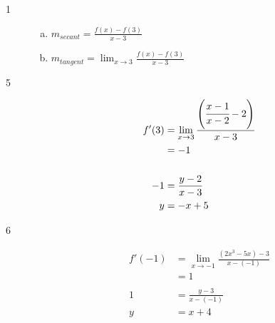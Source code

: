\documentclass[letterpaper, landscape]{exam}
\begin{document}
    \begin{description}

      \item[1] 
        \begin{enumerate}[(a)]

          \item $m_{secant} = \frac{f(x) - f(3)}{x - 3}$ 

          \item $m_{tangent} = \lim_{x \to 3} \frac{f(x) - f(3)}{x - 3}$ 

        \end{enumerate}




      \item[5]

        \begin{align*}
          f'(3) & = \lim_{x \to 3} \frac{ \left( \cfrac{x - 1}{x - 2} - 2 \right) }{x - 3}
          \\    & = -1 \\
          \\
          -1    & = \frac{y - 2}{x - 3} \\
          y     & = -x + 5 \\
        \end{align*}
          

      \item[6]
        \begin{align*}
          f'(-1) & = \lim_{x \to -1} \frac{ \left(  2x^3 - 5x \right) - 3 }{x - (-1)} \\
                 & = 1 \\
          \\
          1      & = \frac{y - 3}{x - (-1)} \\
          y      & = x + 4 \\
        \end{align*}


\end{description}
\end{document}
